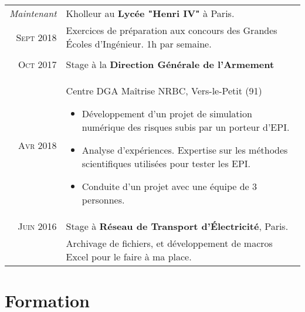 \documentclass[a4paper,10pt]{article} %
\begin{document}
\begin{tabularx}{\linewidth}{r|X}
  \emph{Maintenant} & Kholleur au \textbf{Lycée "Henri IV"} à Paris.\\
  \textsc{Sept 2018} & \small{Exercices de préparation aux concours des Grandes Écoles d'Ingénieur. 1h par semaine.}
  \\&\\

\textsc{Oct 2017} & Stage à la \textbf{Direction Générale de l'Armement}\\
\textsc{Avr 2018} & \small{Centre DGA Maîtrise NRBC, Vers-le-Petit (91)
\begin{itemize}[noitemsep, nolistsep, leftmargin=0.5cm]
  \item Développement d'un projet de simulation numérique des risques subis par un porteur d'EPI.
  \item Analyse d'expériences. Expertise sur les méthodes scientifiques utilisées pour tester les EPI.
  \item Conduite d'un projet avec une équipe de 3 personnes.
\end{itemize}}\\


\textsc{Juin 2016} & Stage à \textbf{Réseau de Transport d'Électricité}, Paris. \\
& \small{Archivage de fichiers, et développement de macros Excel pour le faire à ma place.}
\end{tabularx}


\section{Formation}
\end{document}
